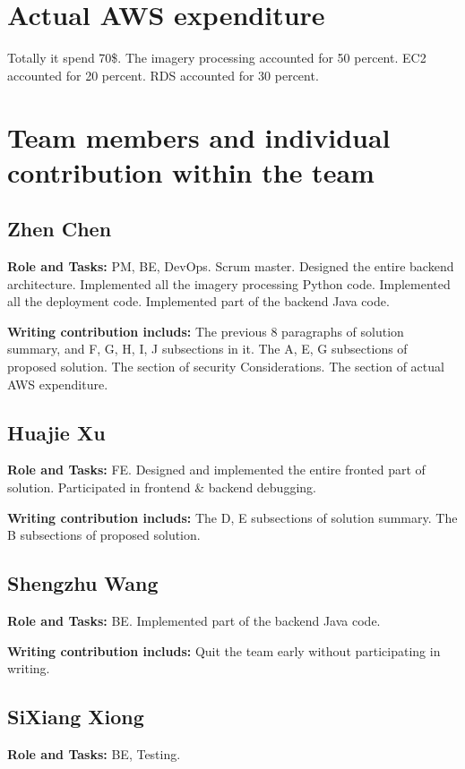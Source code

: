 \documentclass[conference]{IEEEtran}
\begin{document}
\section{Actual AWS expenditure}

Totally it spend 70\$. The imagery processing accounted for 50 percent. EC2 accounted for 20 percent. RDS accounted for 30 percent.

\section{Team members and individual contribution within the team}

\subsection{Zhen Chen}
\textbf{Role and Tasks:} PM, BE, DevOps. Scrum master. Designed the entire backend architecture. 
    Implemented all the imagery processing Python code. Implemented all the deployment code. 
    Implemented part of the backend Java code. 

\textbf{Writing contribution includs:} The previous 8 paragraphs of solution summary, and F, G, H, I, J 
    subsections in it. The A, E, G subsections of proposed solution. The section of security 
    Considerations. The section of actual AWS expenditure.

\subsection{Huajie Xu} 
\textbf{Role and Tasks:} FE. Designed and implemented the entire fronted part of solution. Participated in frontend \& backend debugging.

\textbf{Writing contribution includs:} The D, E subsections of solution summary. The B subsections of proposed solution.

\subsection{Shengzhu Wang}
\textbf{Role and Tasks:} BE. Implemented part of the backend Java code. 
 
\textbf{Writing contribution includs:} Quit the team early without participating in writing.

\subsection{SiXiang Xiong}
\textbf{Role and Tasks:} BE, Testing.
\end{document}

